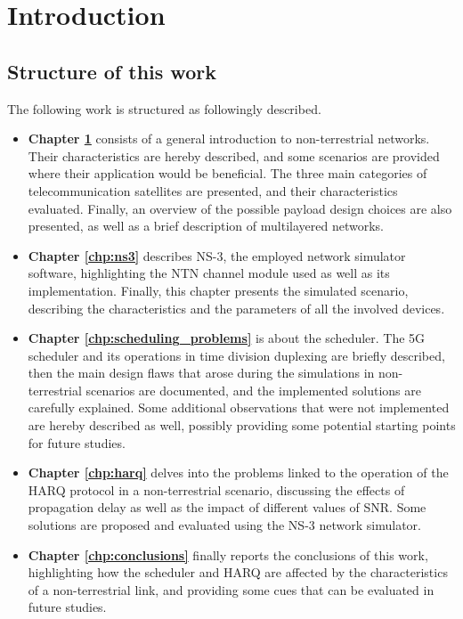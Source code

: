 
\chapter{Introduction}
\label{chp:intro}

\section{Structure of this work}
The following work is structured as followingly described.

\begin{itemize}
    \item \textbf{Chapter \ref{chp:intro}} consists of a general introduction to non-terrestrial networks. Their characteristics are hereby described, and some scenarios are provided where their application would be beneficial. The three main categories of telecommunication satellites are presented, and their characteristics evaluated. Finally, an overview of the possible payload design choices are also presented, as well as a brief description of multilayered networks.
    \item \textbf{Chapter \ref{chp:ns3}} describes NS-3, the employed network simulator software, highlighting the NTN channel module used as well as its implementation. Finally, this chapter presents the simulated scenario, describing the characteristics and the parameters of all the involved devices.
    \item \textbf{Chapter \ref{chp:scheduling_problems}} is about the scheduler. The 5G scheduler and its operations in time division duplexing are briefly described, then the main design flaws that arose during the simulations in non-terrestrial scenarios are documented, and the implemented solutions are carefully explained. Some additional observations that were not implemented are hereby described as well, possibly providing some potential starting points for future studies.
    \item \textbf{Chapter \ref{chp:harq}} delves into the problems linked to the operation of the HARQ protocol in a non-terrestrial scenario, discussing the effects of propagation delay as well as the impact of different values of SNR. Some solutions are proposed and evaluated using the NS-3 network simulator.
    \item \textbf{Chapter \ref{chp:conclusions}} finally reports the conclusions of this work, highlighting how the scheduler and HARQ are affected by the characteristics of a non-terrestrial link, and providing some cues that can be evaluated in future studies.
\end{itemize}

